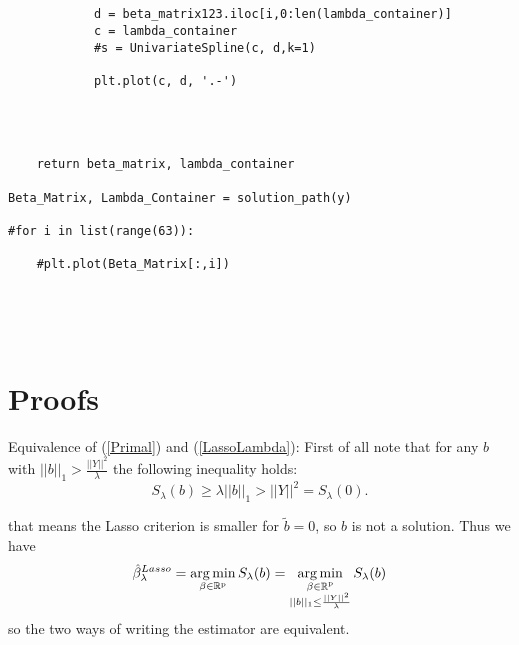 \documentclass{article}
\theoremstyle{definition}
\DeclareMathOperator*{\argmin}{arg\,min}
\begin{document}
\begin{lstlisting}
            
            
            d = beta_matrix123.iloc[i,0:len(lambda_container)]
            c = lambda_container
            #s = UnivariateSpline(c, d,k=1)
            
            plt.plot(c, d, '.-')
        
        
        
        
    return beta_matrix, lambda_container
    
Beta_Matrix, Lambda_Container = solution_path(y)

#for i in list(range(63)):

    #plt.plot(Beta_Matrix[:,i])


    
    

\end{lstlisting}



\section{Proofs}

Equivalence of (\ref{Primal}) and (\ref{LassoLambda}):
First of all note that for any $b$ with $||b||_1 > \frac{||Y||^2}{\lambda}$ the following inequality holds:
\begin{equation}
	S_\lambda(b) \geq \lambda ||b||_1 > ||Y||^2 = S_\lambda(0).
\end{equation}

that means the Lasso criterion is smaller for $\tilde{b}=0$, so $b$ is not a solution.
Thus we have
\begin{equation*}
 \hat{\beta}_\lambda^{Lasso} = \argmin_{\beta \in\rm \mathbb{R}^p} S_\lambda(b) = \argmin_{\substack{\beta \in\rm \mathbb{R}^p\\ ||b||_1 \leq \frac{||Y||^2}{\lambda}}} S_\lambda(b)
\end{equation*}
so the two ways of writing the estimator are equivalent.
\end{document}
